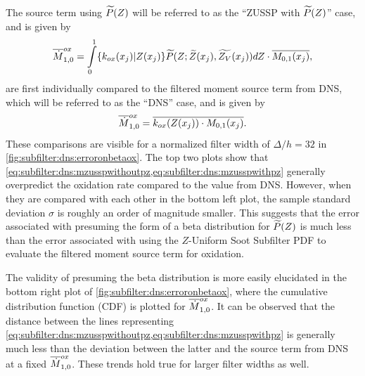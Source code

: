 The source term using $\pz$ will be referred to as the ``ZUSSP with $\pz$'' case, and is given by
\begin{equation}\label{eq:subfilter:dns:mzusspwithpz}
  \fst[M]{1,0}^{ox} = \int\limits_0^1 \{ k_{ox}(x_j)|Z(x_j) \}\tf{P}(Z; \tf{Z}(x_j),\tf{Z_V}(x_j)) dZ \cdot \mean{M_{0,1}(x_j)},
\end{equation}
 are first individually compared to the filtered moment source term from DNS, which will be referred to as the ``DNS'' case, and is given by
\begin{equation}\label{eq:subfilter:dns:mdns}
  \fst[M]{1,0}^{ox} = \mean{ k_{ox}(Z(x_j)) \cdot M_{0,1}(x_j)}.
\end{equation}
These comparisons are visible for a normalized filter width of $\Delta/h = 32$ in \cref{fig:subfilter:dns:erroronbetaox}. The top two plots show that \cref{eq:subfilter:dns:mzusspwithoutpz,eq:subfilter:dns:mzusspwithpz} generally overpredict the oxidation rate compared to the value from DNS. However, when they are compared with each other in the bottom left plot, the sample standard deviation $\sigma$ is roughly an order of magnitude smaller. This suggests that the error associated with presuming the form of a beta distribution for $\pz$ is much less than the error associated with using the $Z$-Uniform Soot Subfilter PDF to evaluate the filtered moment source term for oxidation.

The validity of presuming the beta distribution is more easily elucidated in the bottom right plot of \cref{fig:subfilter:dns:erroronbetaox}, where the cumulative distribution function (CDF) is plotted for $\fst[M]{1,0}^{ox}$. It can be observed that the distance between the lines representing \cref{eq:subfilter:dns:mzusspwithoutpz,eq:subfilter:dns:mzusspwithpz} is generally much less than the deviation between the latter and the source term from DNS at a fixed $\fst[M]{1,0}^{ox}$. These trends hold true for larger filter widths as well. %

